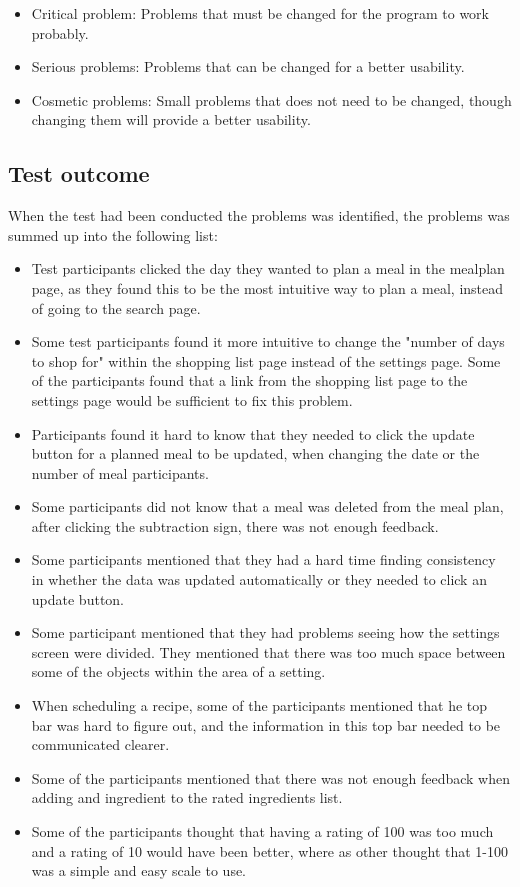 \begin{itemize}
    \item Critical problem: Problems that must be changed for the program to work probably.
    \item Serious problems: Problems that can be changed for a better usability.
    \item Cosmetic problems: Small problems that does not need to be changed, though changing them will provide a better usability.
\end{itemize}

\subsection{Test outcome}

When the test had been conducted the problems was identified, the problems was summed up into the following list:

\begin{itemize}
    \item Test participants clicked the day they wanted to plan a meal in the mealplan page, as they found this to be the most intuitive way to plan a meal, instead of going to the search page.
    \item Some test participants found it more intuitive to change the "number of days to shop for" within the shopping list page instead of the settings page. Some of the participants found that a link from the shopping list page to the settings page would be sufficient to fix this problem.
    \item Participants found it hard to know that they needed to click the update button for a planned meal to be updated, when changing the date or the number of meal participants.
    \item Some participants did not know that a meal was deleted from the meal plan, after clicking the subtraction sign, there was not enough feedback.
    \item Some participants mentioned that they had a hard time finding consistency in whether the data was updated automatically or they needed to click an update button.
    \item Some participant mentioned that they had problems seeing how the settings screen were divided. They mentioned that there was too much space between some of the objects within the area of a setting.
    \item When scheduling a recipe, some of the participants mentioned that he top bar was hard to figure out, and the information in this top bar needed to be communicated clearer.
    \item Some of the participants mentioned that there was not enough feedback when adding and ingredient to the rated ingredients list.
    \item Some of the participants thought that having a rating of 100 was too much and a rating of 10 would have been better, where as other thought that 1-100 was a simple and easy scale to use.
\end{itemize}

